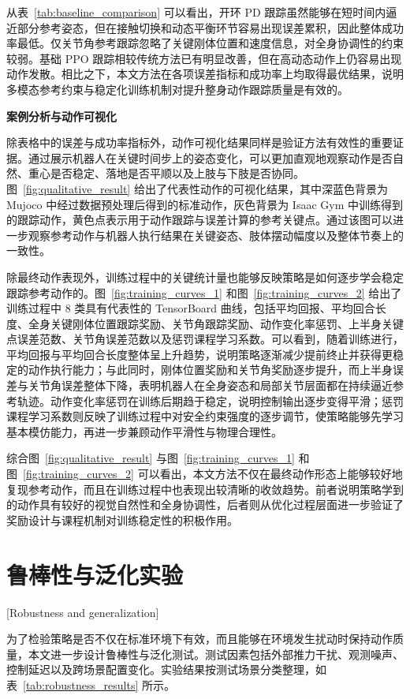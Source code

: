 从表~\ref{tab:baseline_comparison} 可以看出，开环 PD 跟踪虽然能够在短时间内逼近部分参考姿态，但在接触切换和动态平衡环节容易出现误差累积，因此整体成功率最低。仅关节角参考跟踪忽略了关键刚体位置和速度信息，对全身协调性的约束较弱。基础 PPO 跟踪相较传统方法已有明显改善，但在高动态动作上仍容易出现动作发散。相比之下，本文方法在各项误差指标和成功率上均取得最优结果，说明多模态参考约束与稳定化训练机制对提升整身动作跟踪质量是有效的。

\noindent\textbf{案例分析与动作可视化}

除表格中的误差与成功率指标外，动作可视化结果同样是验证方法有效性的重要证据。通过展示机器人在关键时间步上的姿态变化，可以更加直观地观察动作是否自然、重心是否稳定、落地是否平顺以及上肢与下肢是否协同。图~\ref{fig:qualitative_result} 给出了代表性动作的可视化结果，其中深蓝色背景为 Mujoco 中经过数据预处理后得到的标准动作，灰色背景为 Isaac Gym 中训练得到的跟踪动作，黄色点表示用于动作跟踪与误差计算的参考关键点。通过该图可以进一步观察参考动作与机器人执行结果在关键姿态、肢体摆动幅度以及整体节奏上的一致性。

除最终动作表现外，训练过程中的关键统计量也能够反映策略是如何逐步学会稳定跟踪参考动作的。图~\ref{fig:training_curves_1} 和图~\ref{fig:training_curves_2} 给出了训练过程中 8 类具有代表性的 TensorBoard 曲线，包括平均回报、平均回合长度、全身关键刚体位置跟踪奖励、关节角跟踪奖励、动作变化率惩罚、上半身关键点误差范数、关节角误差范数以及惩罚课程学习系数。可以看到，随着训练进行，平均回报与平均回合长度整体呈上升趋势，说明策略逐渐减少提前终止并获得更稳定的动作执行能力；与此同时，刚体位置奖励和关节角奖励逐步提升，而上半身误差与关节角误差整体下降，表明机器人在全身姿态和局部关节层面都在持续逼近参考轨迹。动作变化率惩罚在训练后期趋于稳定，说明控制输出逐步变得平滑；惩罚课程学习系数则反映了训练过程中对安全约束强度的逐步调节，使策略能够先学习基本模仿能力，再进一步兼顾动作平滑性与物理合理性。

综合图~\ref{fig:qualitative_result} 与图~\ref{fig:training_curves_1} 和图~\ref{fig:training_curves_2} 可以看出，本文方法不仅在最终动作形态上能够较好地复现参考动作，而且在训练过程中也表现出较清晰的收敛趋势。前者说明策略学到的动作具有较好的视觉自然性和全身协调性，后者则从优化过程层面进一步验证了奖励设计与课程机制对训练稳定性的积极作用。

\section{鲁棒性与泛化实验}[Robustness and generalization]

为了检验策略是否不仅在标准环境下有效，而且能够在环境发生扰动时保持动作质量，本文进一步设计鲁棒性与泛化测试。测试因素包括外部推力干扰、观测噪声、控制延迟以及跨场景配置变化。实验结果按测试场景分类整理，如表~\ref{tab:robustness_results} 所示。

